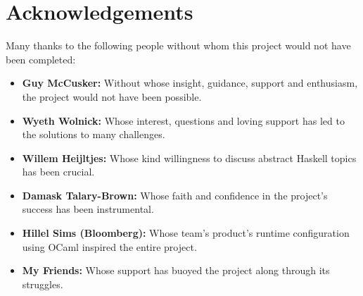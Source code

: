 \chapter*{Acknowledgements} %
\label{cha:acknowledgements}
Many thanks to the following people without whom this project would not have been completed:
\begin{itemize}
    \item \textbf{Guy McCusker:} Without whose insight, guidance, support and enthusiasm, the project would not have been possible. 
    \item \textbf{Wyeth Wolnick:} Whose interest, questions and loving support has led to the solutions to many challenges.
    \item \textbf{Willem Heijltjes:} Whose kind willingness to discuss abstract Haskell topics has been crucial.
    \item \textbf{Damask Talary-Brown:} Whose faith and confidence in the project's success has been instrumental. 
    \item \textbf{Hillel Sims (Bloomberg):} Whose team's product's runtime configuration using OCaml inspired the entire project.
    \item \textbf{My Friends:} Whose support has buoyed the project along through its struggles. 
\end{itemize}

